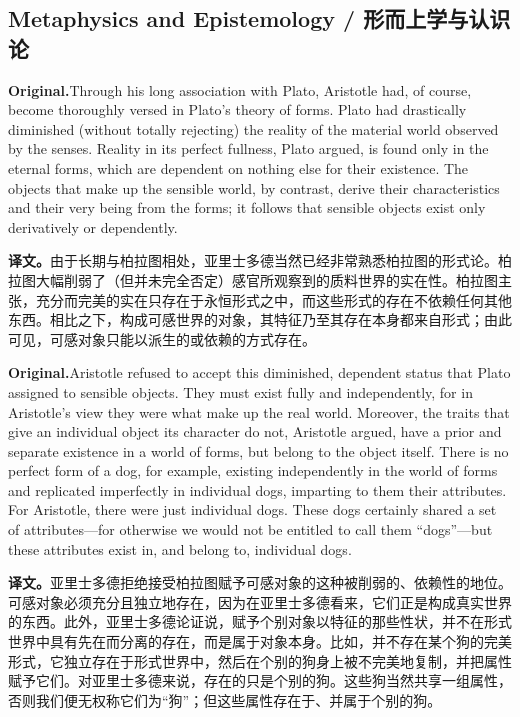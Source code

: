 \documentclass[UTF8]{ctexart}
\newcommand{\orig}{\par\noindent\textbf{Original.}\quad}
\newcommand{\zh}{\par\noindent\textbf{译文。}\quad}
\begin{document}
\subsection*{Metaphysics and Epistemology / 形而上学与认识论}

\orig Through his long association with Plato, Aristotle had, of course, become thoroughly versed in Plato's theory of forms. Plato had drastically diminished (without totally rejecting) the reality of the material world observed by the senses. Reality in its perfect fullness, Plato argued, is found only in the eternal forms, which are dependent on nothing else for their existence. The objects that make up the sensible world, by contrast, derive their characteristics and their very being from the forms; it follows that sensible objects exist only derivatively or dependently.

\zh 由于长期与柏拉图相处，亚里士多德当然已经非常熟悉柏拉图的形式论。柏拉图大幅削弱了（但并未完全否定）感官所观察到的质料世界的实在性。柏拉图主张，充分而完美的实在只存在于永恒形式之中，而这些形式的存在不依赖任何其他东西。相比之下，构成可感世界的对象，其特征乃至其存在本身都来自形式；由此可见，可感对象只能以派生的或依赖的方式存在。

\orig Aristotle refused to accept this diminished, dependent status that Plato assigned to sensible objects. They must exist fully and independently, for in Aristotle's view they were what make up the real world. Moreover, the traits that give an individual object its character do not, Aristotle argued, have a prior and separate existence in a world of forms, but belong to the object itself. There is no perfect form of a dog, for example, existing independently in the world of forms and replicated imperfectly in individual dogs, imparting to them their attributes. For Aristotle, there were just individual dogs. These dogs certainly shared a set of attributes---for otherwise we would not be entitled to call them ``dogs''---but these attributes exist in, and belong to, individual dogs.

\zh 亚里士多德拒绝接受柏拉图赋予可感对象的这种被削弱的、依赖性的地位。可感对象必须充分且独立地存在，因为在亚里士多德看来，它们正是构成真实世界的东西。此外，亚里士多德论证说，赋予个别对象以特征的那些性状，并不在形式世界中具有先在而分离的存在，而是属于对象本身。比如，并不存在某个狗的完美形式，它独立存在于形式世界中，然后在个别的狗身上被不完美地复制，并把属性赋予它们。对亚里士多德来说，存在的只是个别的狗。这些狗当然共享一组属性，否则我们便无权称它们为“狗”；但这些属性存在于、并属于个别的狗。
\end{document}
